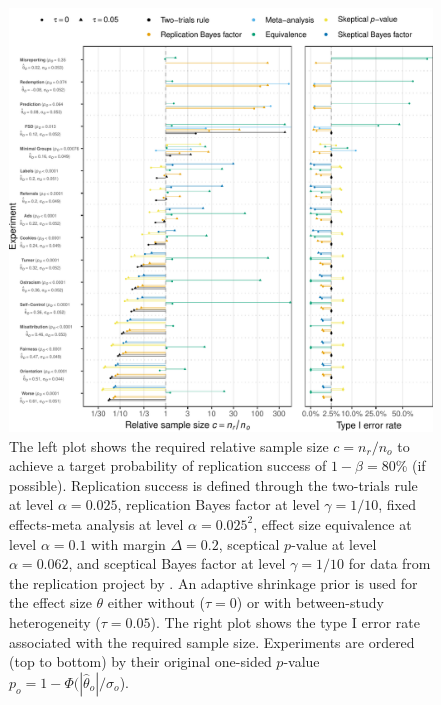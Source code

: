 \begin{subappendices}
\begin{figure}[!htb]
\begin{knitrout}
\color{fgcolor}
\includegraphics[width=\maxwidth]{images/paper3/sup-ssd-protzko-1}
\end{knitrout}
\caption{The left plot shows the required relative sample size $c = n_r/n_o$ to
  achieve a target probability of replication success of
  $1 - \beta = 80$\% (if possible). Replication success
  is defined through the two-trials rule at level $\alpha = 0.025$,
  replication Bayes factor at level $\gamma = 1/10$, fixed
  effects-meta analysis at level $\alpha = 0.025^{2}$,
  effect size equivalence at level $\alpha = 0.1$ with margin
  $\Delta = 0.2$, sceptical $p$-value at level
  $\alpha = 0.062$, and sceptical Bayes factor at level
  $\gamma = 1/10$ for data from the replication project by
  \citet{Protzko2020}. An adaptive shrinkage prior is used for the effect size
  $\theta$ either without ($\tau = 0$) or with between-study heterogeneity
  ($\tau = 0.05$). The right plot shows the type I error
  rate associated with the required sample size. Experiments are ordered (top to
  bottom) by their original one-sided $p$-value
  $p_{o} = 1 - \Phi(|\hat{\theta}_{o}|/\sigma_{o}$).}
\label{fig:ssd-all-shrink}
\end{figure}



\end{subappendices}
